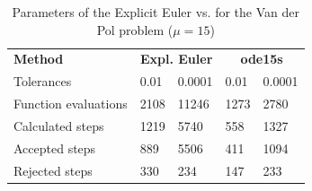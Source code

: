 \begin{table}[H]
    \centering
    \begin{tabular}{@{}l|ll|ll@{}}
    \toprule
    \textbf{Method}      & \multicolumn{2}{c|}{\textbf{Expl. Euler}} & \multicolumn{2}{c}{\textbf{ode15s}} \\
    Tolerances           & 0.01               & 0.0001               & 0.01            & 0.0001            \\ \midrule
    Function evaluations & 2108               & 11246                & 1273            & 2780              \\
    Calculated steps     & 1219               & 5740                 & 558             & 1327              \\
    Accepted steps       & 889                & 5506                 & 411             & 1094              \\
    Rejected steps       & 330                & 234                  & 147             & 233               \\ \bottomrule
    \end{tabular}
    \caption{Parameters of the Explicit Euler vs.  for the Van der Pol problem ($\mathit{\mu = 15}$)}
    \label{2_6_adaptive_mu_15_table}
\end{table}

